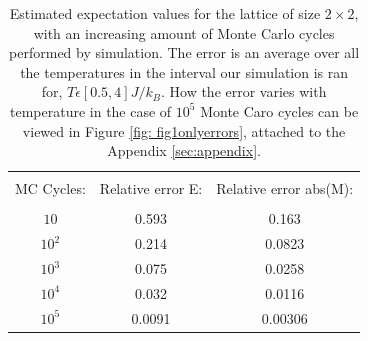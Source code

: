\documentclass[10pt, nofootinbib, twocolumn]{revtex4-1}
\begin{document}
\newpage



\begin{center}
    \begin{table}[h]
    \caption{Estimated expectation values for the lattice of size $2\times 2$, with an increasing amount of Monte Carlo cycles performed by simulation. The error is an average over all the temperatures in the interval our simulation is ran for, $T\epsilon [0.5,4]J/k_B$. How the error varies with temperature in the case of $10^5$ Monte Caro cycles can be viewed in Figure \ref{fig: fig1onlyerrors}, attached to the Appendix \ref{sec:appendix}.} 
        \begin{tabular*}{0.5\textwidth}{@{\extracolsep{\fill}}ccc}
        \toprule
        \hline \\
        MC Cycles:    &   Relative error E:   &  Relative error abs(M): \\
        \midrule
        \hline \\
        $10$       &        0.593      &     0.163 \\
        $10^2$      &         0.214     &      0.0823 \\
        $10^3$      &        0.075    &       0.0258 \\
        $10^4$      &         0.032    &         0.0116 \\
        $10^5$        &        0.0091    &        0.00306 \\
        \hline
        \bottomrule
        \end{tabular*}\label{tab:mcerr}
    \end{table}
\end{center}
\end{document}
